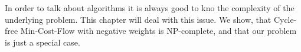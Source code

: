 In order to talk about algorithms it is always good to kno the complexity of the underlying problem. This chapter will 
deal with this issue. We show, that Cycle-free Min-Cost-Flow with negative weights is NP-complete, and that our problem 
is just a special case.

